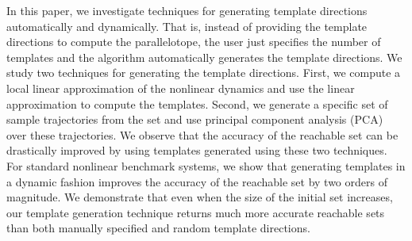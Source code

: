 In this paper, we investigate techniques for generating template directions automatically and dynamically.
%
That is, instead of providing the template directions to compute the parallelotope, the user just specifies the number of templates and the algorithm automatically generates the template directions.
%
We study two techniques for generating the template directions.
%
First, we compute a local linear approximation of the nonlinear dynamics and use the linear approximation to compute the templates.
%
Second, we generate a specific set of sample trajectories from the set and use principal component analysis (PCA) over these trajectories.
%
We observe that the accuracy of the reachable set can be drastically improved by using templates generated using these two techniques.
%
For standard nonlinear benchmark systems, we show that generating templates in a dynamic fashion improves the accuracy of the reachable set by two orders of magnitude.
%
We demonstrate that even when the size of the initial set increases, our template generation technique returns much more accurate reachable sets than both manually specified and random template directions.




